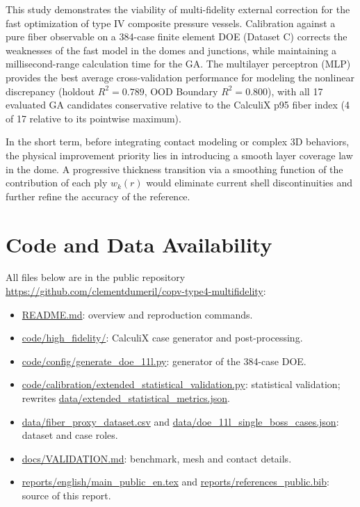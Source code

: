 \documentclass[10pt,twocolumn]{article}
\begin{document}
This study demonstrates the viability of multi-fidelity external correction for the fast optimization of type IV composite pressure vessels. Calibration against a pure fiber observable on a 384-case finite element DOE (Dataset C) corrects the weaknesses of the fast model in the domes and junctions, while maintaining a millisecond-range calculation time for the GA. The multilayer perceptron (MLP) provides the best average cross-validation performance for modeling the nonlinear discrepancy (holdout $R^2 = \num{0.789}$, OOD Boundary $R^2 = \num{0.800}$), with all 17 evaluated GA candidates conservative relative to the CalculiX p95 fiber index (4 of 17 relative to its pointwise maximum).

In the short term, before integrating contact modeling or complex 3D behaviors, the physical improvement priority lies in introducing a smooth layer coverage law in the dome. A progressive thickness transition via a smoothing function of the contribution of each ply $w_k(r)$ would eliminate current shell discontinuities and further refine the accuracy of the reference.

\section{Code and Data Availability}

All files below are in the public repository \url{https://github.com/clementdumeril/copv-type4-multifidelity}:
\begin{itemize}
    \item \url{README.md}: overview and reproduction commands.
    \item \url{code/high_fidelity/}: CalculiX case generator and post-processing.
    \item \url{code/config/generate_doe_11l.py}: generator of the 384-case DOE.
    \item \url{code/calibration/extended_statistical_validation.py}: statistical validation; rewrites \url{data/extended_statistical_metrics.json}.
    \item \url{data/fiber_proxy_dataset.csv} and \url{data/doe_11l_single_boss_cases.json}: dataset and case roles.
    \item \url{docs/VALIDATION.md}: benchmark, mesh and contact details.
    \item \url{reports/english/main_public_en.tex} and \url{reports/references_public.bib}: source of this report.
\end{itemize}
\end{document}
